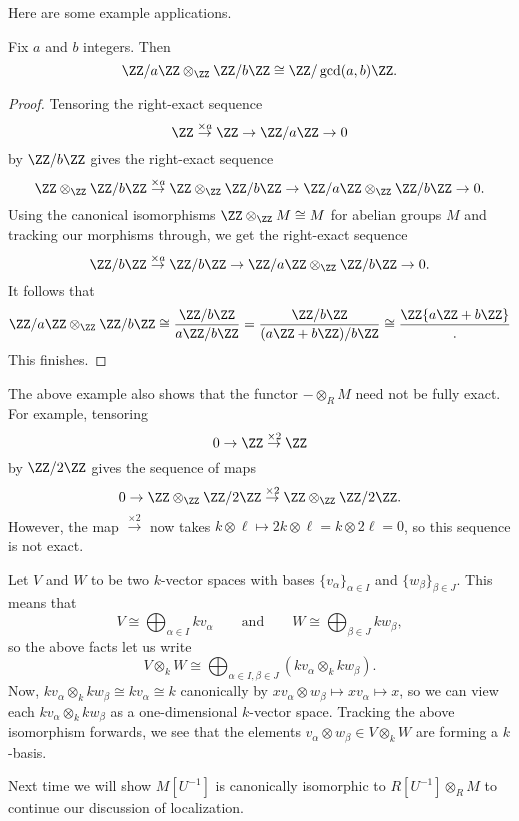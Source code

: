 
Here are some example applications.
\begin{exe} \label{exe:zmodtensors}
	Fix $a$ and $b$ integers. Then
	\[\ZZ/a\ZZ\otimes_\ZZ\ZZ/b\ZZ\cong\ZZ/\gcd(a,b)\ZZ.\]
\end{exe}
\begin{proof}
	Tensoring the right-exact sequence
	\[\ZZ\stackrel{\times a}\to\ZZ\to\ZZ/a\ZZ\to0\]
	by $\ZZ/b\ZZ$ gives the right-exact sequence
	\[\ZZ\otimes_\ZZ\ZZ/b\ZZ\stackrel{\times a}\to\ZZ\otimes_\ZZ\ZZ/b\ZZ\to\ZZ/a\ZZ\otimes_\ZZ\ZZ/b\ZZ\to0.\]
	Using the canonical isomorphisms $\ZZ\otimes_\ZZ M\cong M$ for abelian groups $M$ and tracking our morphisms through, we get the right-exact sequence
	\[\ZZ/b\ZZ\stackrel{\times a}\to\ZZ/b\ZZ\to\ZZ/a\ZZ\otimes_\ZZ\ZZ/b\ZZ\to0.\]
	It follows that
	\[\ZZ/a\ZZ\otimes_\ZZ\ZZ/b\ZZ\cong\frac{\ZZ/b\ZZ}{a\ZZ/b\ZZ}=\frac{\ZZ/b\ZZ}{(a\ZZ+b\ZZ)/b\ZZ}\cong\frac\ZZ{a\ZZ+b\ZZ}.\]
	This finishes.
\end{proof}
\begin{remark}
	The above example also shows that the functor $-\otimes_RM$ need not be fully exact. For example, tensoring
	\[0\to\ZZ\stackrel{\times2}\to\ZZ\]
	by $\ZZ/2\ZZ$ gives the sequence of maps
	\[0\to\ZZ\otimes_\ZZ\ZZ/2\ZZ\stackrel{\times2}\to\ZZ\otimes_\ZZ\ZZ/2\ZZ.\]
	However, the map $\stackrel{\times2}\to$ now takes $k\otimes\ell\mapsto2k\otimes\ell=k\otimes2\ell=0$, so this sequence is not exact.
\end{remark}
\begin{example} \label{ex:tensorvecspaces}
	Let $V$ and $W$ to be two $k$-vector spaces with bases $\{v_\alpha\}_{\alpha\in I}$ and $\{w_\beta\}_{\beta\in J}$. This means that
	\[V\cong\bigoplus_{\alpha\in I}kv_\alpha\qquad\text{and}\qquad W\cong\bigoplus_{\beta\in J}kw_\beta,\]
	so the above facts let us write
	\[V\otimes_kW\cong\bigoplus_{\alpha\in I,\beta\in J}(kv_\alpha\otimes_kkw_\beta).\]
	Now, $kv_\alpha\otimes_kkw_\beta\cong kv_\alpha\cong k$ canonically by $xv_\alpha\otimes w_\beta\mapsto xv_\alpha\mapsto x$, so we can view each $kv_\alpha\otimes_kkw_\beta$ as a one-dimensional $k$-vector space. Tracking the above isomorphism forwards, we see that the elements $v_\alpha\otimes w_\beta\in V\otimes_kW$ are forming a $k$-basis.
\end{example}
Next time we will show $M\left[U^{-1}\right]$ is canonically isomorphic to $R\left[U^{-1}\right]\otimes_RM$ to continue our discussion of localization.